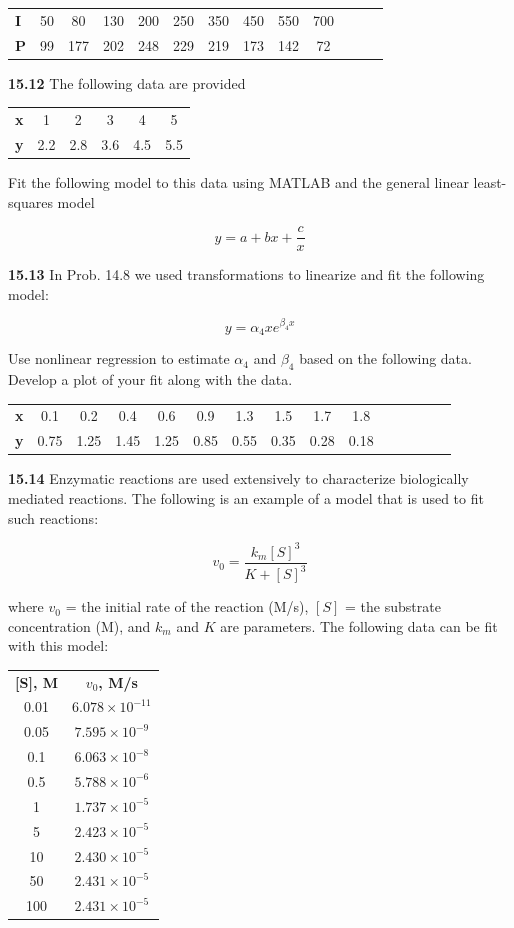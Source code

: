 \documentclass[../main.tex]{subfiles}
\begin{document}
\begin{multicols}{2}
	\noindent
	\begin{tabular}{l c c c c c c c c c c c c}
		\textbf{I} & 50 & 80 & 130 & 200 & 250 & 350 & 450 & 550 & 700 \\
		\textbf{P} & 99 & 177 & 202 & 248 & 229 & 219 & 173 & 142 & 72
	\end{tabular}

	\noindent\textbf{15.12} The following data are provided

	\noindent
	\begin{tabular}{l c c c c c}
		\textbf{x} & 1 & 2 & 3 & 4 & 5 \\
		\textbf{y} & 2.2 & 2.8 & 3.6 & 4.5 & 5.5
	\end{tabular}

	\noindent Fit the following model to this data using MATLAB and the
	general linear least-squares model

	$$
		y= a + bx + \frac{c}{x}
	$$

	\noindent\textbf{15.13} In Prob. 14.8 we used transformations to linearize
	and fit the following model:

	$$
		y = \alpha_4 x e^{\beta_4 x}
	$$

	\noindent Use nonlinear regression to estimate $\alpha_4$ and $\beta_4$ based on the
	following data. Develop a plot of your fit along with the data.

	\noindent
	\begin{tabular}{l c c c c c c c c c c c c c c}
		\textbf{x}& 0.1& 0.2& 0.4& 0.6& 0.9 &1.3 &1.5 &1.7 &1.8 \\
		\textbf{y}& 0.75 &1.25 &1.45 &1.25& 0.85& 0.55 &0.35& 0.28& 0.18
	\end{tabular}

	\noindent\textbf{15.14}  Enzymatic reactions are used extensively to characterize biologically mediated reactions. The following is an example of a model that is used to fit such reactions:

	$$
		v_0 = \frac{k_m [S]^3}{K + [S]^3}
	$$

	\noindent where $v_0$ = the initial rate of the reaction (M/s), $[S]$ = the substrate concentration (M), and $k_m$ and $K$ are parameters. The following data can be fit with this model:

	\noindent
	\begin{tabular}{c c}
		\textbf{[S], M} & \textbf{$v_0$, M/s} \\
 0.01 &  $6.078 \times 10^{-11}$ \\
0.05 &  $7.595 \times 10^{-9}$ \\
0.1 &  $6.063 \times 10^{-8}$ \\
 0.5 &  $5.788 \times 10^{-6}$ \\
 1 &  $1.737 \times 10^{-5}$ \\
 5 &  $2.423 \times 10^{-5}$ \\
10 &  $2.430 \times 10^{-5}$ \\
50 &  $2.431 \times 10^{-5}$ \\
 100 &  $2.431 \times 10^{-5}$ 
	\end{tabular}


\end{multicols}
\end{document}
